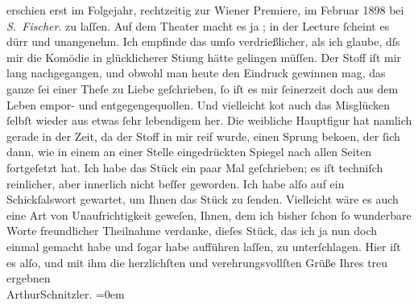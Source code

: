 \begin{ledgroupsized}[t]{13cm}
{{{                  erschien erst im Folgejahr, rechtzeitig zur Wiener Premiere, im Februar 1898 bei \emph{S. Fischer}.}}}\label{K_L00636-1h} zu laſſen. Auf dem Theater macht es ja
                  \label{K_L00636-2v}\label{K_L00636-2h}; in der Lecture ſcheint es dürr und
               unangenehm. Ich empfinde das umſo verdrießlicher, als ich glaube, dſs mir die Komödie
               in glücklicherer Sti{\geminationm}ung hätte gelingen müſſen. {\pb}Der Stoff iſt mir lang nachgegangen, und obwohl
               man heute den Eindruck gewinnen mag, das ganze ſei einer Theſe zu Liebe geſchrieben,
               ſo iſt es mir ſeinerzeit doch aus dem Leben empor- und entgegengequollen. Und
               vielleicht ko{\geminationm}t auch das Misglücken ſelbſt wieder aus
               etwas ſehr lebendigem {\pb}her. Die weibliche
               Hauptfigur hat namlich gerade in der Zeit, da der Stoff in mir reif wurde, einen
               Sprung beko{\geminationm}en, der ſich dann, wie in einem an einer
               Stelle eingedrückten Spiegel nach allen Seiten fortgeſetzt hat. Ich habe das Stück ein paar Mal geſchrieben;
               es iſt techniſch reinlicher, aber innerlich {\pb}nicht
               beſſer geworden. Ich habe alſo auf ein Schickſalswort gewartet, um Ihnen das Stück zu
               ſenden. Vielleicht wäre es auch eine Art von Unaufrichtigkeit geweſen, Ihnen, dem ich
               bisher ſchon ſo wunderbare Worte freundlicher Theilnahme verdanke, dieſes Stück, das
               ich ja nun doch einmal {\pb}gemacht habe und ſogar
               habe aufführen laſſen, zu unterſchlagen.\pend
           \pstart
           Hier iſt es alſo, und mit
               ihm die herzlichſten und verehrungsvollſten Grüße Ihres treu ergebnen{\\[\baselineskip]}\spacefill\mbox{ArthurSchnitzler.}\pend
           \leftskip=0em{}
         
         \endnumbering{}\end{ledgroupsized}  \newcommand{\dateiname}{L00636}\newcommand{\titel}{Arthur Schnitzler an Georg Brandes, 11. 1. 1897}\newcommand{\editorInnen}{Martin Anton Müller und Gerd-Hermann Susen}
      